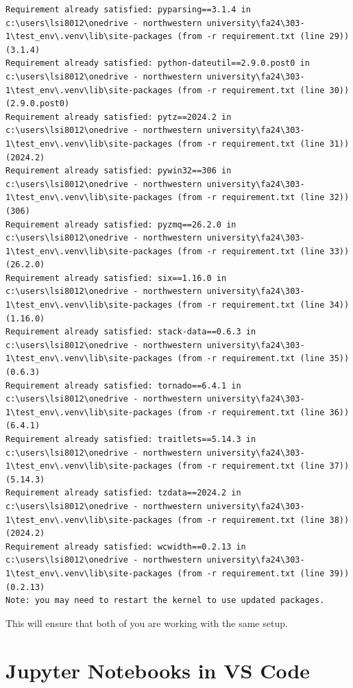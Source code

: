 \documentclass[
  letterpaper,
  DIV=11,
  numbers=noendperiod]{scrreprt}
\begin{document}
\begin{verbatim}
Requirement already satisfied: pyparsing==3.1.4 in c:\users\lsi8012\onedrive - northwestern university\fa24\303-1\test_env\.venv\lib\site-packages (from -r requirement.txt (line 29)) (3.1.4)
Requirement already satisfied: python-dateutil==2.9.0.post0 in c:\users\lsi8012\onedrive - northwestern university\fa24\303-1\test_env\.venv\lib\site-packages (from -r requirement.txt (line 30)) (2.9.0.post0)
Requirement already satisfied: pytz==2024.2 in c:\users\lsi8012\onedrive - northwestern university\fa24\303-1\test_env\.venv\lib\site-packages (from -r requirement.txt (line 31)) (2024.2)
Requirement already satisfied: pywin32==306 in c:\users\lsi8012\onedrive - northwestern university\fa24\303-1\test_env\.venv\lib\site-packages (from -r requirement.txt (line 32)) (306)
Requirement already satisfied: pyzmq==26.2.0 in c:\users\lsi8012\onedrive - northwestern university\fa24\303-1\test_env\.venv\lib\site-packages (from -r requirement.txt (line 33)) (26.2.0)
Requirement already satisfied: six==1.16.0 in c:\users\lsi8012\onedrive - northwestern university\fa24\303-1\test_env\.venv\lib\site-packages (from -r requirement.txt (line 34)) (1.16.0)
Requirement already satisfied: stack-data==0.6.3 in c:\users\lsi8012\onedrive - northwestern university\fa24\303-1\test_env\.venv\lib\site-packages (from -r requirement.txt (line 35)) (0.6.3)
Requirement already satisfied: tornado==6.4.1 in c:\users\lsi8012\onedrive - northwestern university\fa24\303-1\test_env\.venv\lib\site-packages (from -r requirement.txt (line 36)) (6.4.1)
Requirement already satisfied: traitlets==5.14.3 in c:\users\lsi8012\onedrive - northwestern university\fa24\303-1\test_env\.venv\lib\site-packages (from -r requirement.txt (line 37)) (5.14.3)
Requirement already satisfied: tzdata==2024.2 in c:\users\lsi8012\onedrive - northwestern university\fa24\303-1\test_env\.venv\lib\site-packages (from -r requirement.txt (line 38)) (2024.2)
Requirement already satisfied: wcwidth==0.2.13 in c:\users\lsi8012\onedrive - northwestern university\fa24\303-1\test_env\.venv\lib\site-packages (from -r requirement.txt (line 39)) (0.2.13)
Note: you may need to restart the kernel to use updated packages.
\end{verbatim}

This will ensure that both of you are working with the same setup.

\hypertarget{jupyter-notebooks-in-vs-code}{%
\section{Jupyter Notebooks in VS
Code}\label{jupyter-notebooks-in-vs-code}}
\end{document}
